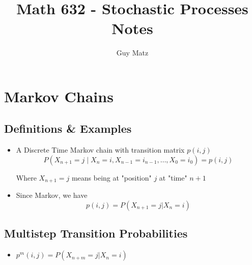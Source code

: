 \documentclass{report}
\title{
  \Huge{Math 632 - Stochastic Processes}
  \\
  Notes
}
\author{\huge{Guy Matz}}
\date{}
\begin{document}
\chapter{Markov Chains}

\section{Definitions \& Examples}
  \begin{itemize}
    \item A Discrete Time Markov chain with transition matrix $p(i, j)$
\[ P\left(X_{n+1}=j \mid X_n=i, X_{n-1}=i_{n-1}, \ldots, X_0=i_0\right)=p(i, j) \]

    Where $X_{n+1} = j$ means being at "position" $j$ at "time" $n+1$ 
    \item Since Markov, we have
      \[ p(i, j) = P(X_{n+1} = j  | X_n = i) \]

  \end{itemize}
  

\section{Multistep Transition Probabilities}

  \begin{itemize}
    \item $p^m(i,j) = P(X_{n+m} = j | X_n = i)$
  \end{itemize}
\end{document}
